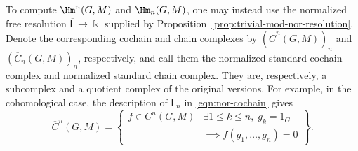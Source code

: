 \begin{remark}\label{rem:nor-cochain}
	To compute $\Hm^n(G,M)$ and $\Hm_n(G,M)$, one may instead use the
	normalized free resolution $\overline{\mathsf{L}}\to\Bbbk$ supplied by
	Proposition~\ref{prop:trivial-mod-nor-resolution}. Denote the corresponding
	cochain and chain complexes by $(\overline{C}^n(G,M))_n$ and
	$(\overline{C}_n(G,M))_n$, respectively, and call them the normalized
	standard cochain complex and normalized standard chain complex. They are,
	respectively, a subcomplex and a quotient complex of the original
	versions. For example, in the cohomological case, the description of
	$\mathsf{L}_n$ in \eqref{eqn:nor-cochain} gives
	\[ \overline{C}^n(G, M) = \left\{\begin{array}{r|l}
		f \in C^n(G, M) & \exists 1 \leq k \leq n, \; g_k = 1_G \\
		& \implies f(g_1, \ldots, g_n) = 0
	\end{array}\right\}. \]
\end{remark}
